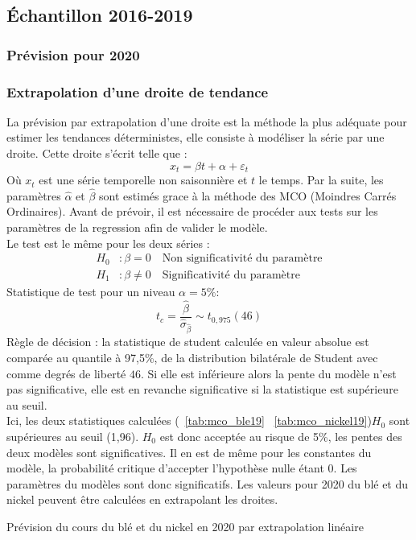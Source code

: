 \subsection{Échantillon 2016-2019}\label{prev1}
\subsubsection{Prévision pour 2020}
\subsubsection*{Extrapolation d'une droite de tendance} 
La prévision par extrapolation d'une droite est la méthode la plus adéquate pour estimer les tendances déterministes, elle consiste à modéliser la série par une droite.
Cette droite s'écrit telle que :
\begin{equation*}
    x_{t} = \beta t + \alpha + \varepsilon_{t}
\end{equation*}
Où $x_{t}$ est une série temporelle non saisonnière et $t$ le temps. Par la suite, les paramètres $\hat{\alpha}$ et $\hat{\beta}$ sont estimés grace à la méthode des MCO 
(Moindres Carrés Ordinaires). Avant de prévoir, il est nécessaire de procéder aux tests sur les paramètres de la regression afin de valider le modèle.\\[11pt]
Le test est le même pour les deux séries :
\begin{equation*}
    \begin{split}
        H_{0} &: \beta = 0     \quad \text{Non significativité du paramètre} \\
        H_{1} &: \beta \neq 0  \quad \text{Significativité du paramètre}
    \end{split}
\end{equation*}
Statistique de test pour un niveau $\alpha = 5\%$:
\begin{equation*}
    t_{c} = \frac{\hat{\beta}}{\hat{\sigma}_{\hat{\beta}}}\sim t_{0,975}(46)
\end{equation*}
Règle de décision : la statistique de student calculée en valeur absolue est comparée au quantile à 97,5\%, de la distribution bilatérale de Student avec comme 
degrés de liberté $46$. Si elle est inférieure alors la pente du modèle n'est pas significative, elle est en revanche significative si la statistique est 
supérieure au seuil.\\[11pt]
Ici, les deux statistiques calculées (~\ref{tab:mco_ble19} ~\ref{tab:mco_nickel19})$H_{0}$ sont supérieures au seuil (1,96). $H_{0}$ est donc acceptée au risque de 5\%, 
les pentes des deux modèles sont significatives. Il en est de même pour les constantes du modèle, la probabilité critique d'accepter l'hypothèse nulle étant 0. Les 
paramètres du modèles sont donc significatifs. Les valeurs pour 2020 du blé et du nickel peuvent être calculées en extrapolant les droites.
\begin{table}[H]
        \centering
        \caption{Prévision du cours du blé et du nickel en 2020 par extrapolation linéaire}
        \sffamily
        
\end{table}


